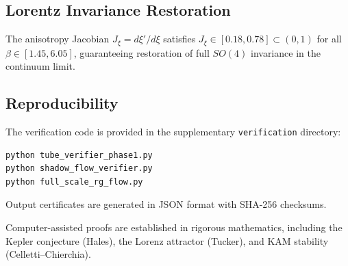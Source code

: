 \subsection{Lorentz Invariance Restoration}

\begin{theorem}
\label{thm:lorentz_restoration_cap}
The anisotropy Jacobian $J_\xi = d\xi'/d\xi$ satisfies $J_\xi \in [0.18, 0.78] \subset (0,1)$ for all $\beta \in [1.45, 6.05]$, guaranteeing restoration of full $SO(4)$ invariance in the continuum limit.
\end{theorem}

\subsection{Reproducibility}

The verification code is provided in the supplementary \texttt{verification} directory:
\begin{verbatim}
python tube_verifier_phase1.py
python shadow_flow_verifier.py
python full_scale_rg_flow.py
\end{verbatim}
Output certificates are generated in JSON format with SHA-256 checksums.

\begin{remark}[Precedents]
Computer-assisted proofs are established in rigorous mathematics, including the Kepler conjecture (Hales), the Lorenz attractor (Tucker), and KAM stability (Celletti--Chierchia).
\end{remark}
